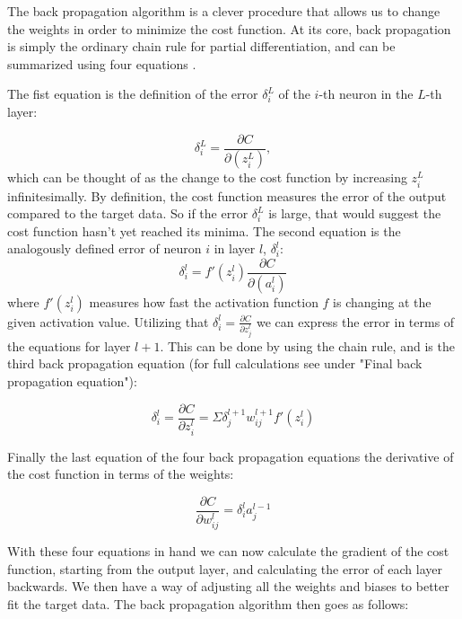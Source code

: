 \documentclass[a4paper, UKenglish, 11pt]{uiomaster}
\begin{document}
The back propagation algorithm is a clever procedure that allows us to change the weights in order to minimize the cost function. At its core, back propagation is simply the ordinary chain rule for partial differentiation, and can be summarized using four equations \cite{96}.

The fist equation is the definition of the error $\delta_i^L$ of the $i$-th neuron in the $L$-th layer:

\begin{equation}
    \delta_i^L = \frac{\partial C}{\partial(z_i^L)},
\label{eq:I}
\end{equation}
which can be thought of as the change to the cost function by increasing $z_i^L$ infinitesimally. By definition, the cost function measures the error of the output compared to the target data. So if the error $\delta_i^L$ is large, that would suggest the cost function hasn't yet reached its minima.
The second equation is the analogously defined error of neuron $i$ in layer $l$, $\delta_i^l$:
\begin{equation}
    \delta_i^l = f'(z_i^l)\frac{\partial C}{\partial(a_i^l)}
\label{eq:II}
\end{equation}
where $f'(z_i^l)$ measures how fast the activation function $f$ is changing at the given activation value.
Utilizing that $\delta_i^l = \frac{\partial C}{\partial z_j^l}$ we can express the error in terms of the equations for layer $l+1$. This can be done by using the chain rule, and is the third back propagation equation (for full calculations see \cite{102} under "Final back propagation equation"):

\begin{equation}
    \delta_i^l = \frac{\partial C}{\partial z^l_{i}} = \Sigma \delta_j^{l+1}w_{ij}^{l+1}f'(z_i^l)
\label{eq:III}
\end{equation}

Finally the last equation of the four back propagation equations the derivative of the cost function in terms of the weights:

\begin{equation}
    \frac{\partial C}{\partial w^l_{ij}} = \delta_i^l a_j^{l-1}
\label{eq:IV}
\end{equation}

With these four equations in hand we can now calculate the gradient of the cost function, starting from the output layer, and calculating the error of each layer backwards. We then have a way of adjusting all the weights and biases to better fit the target data. The back propagation algorithm then goes as follows:
\end{document}
